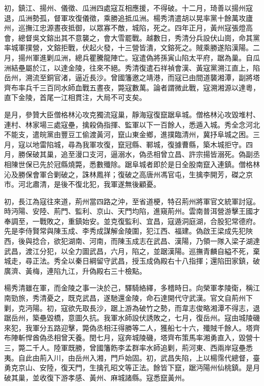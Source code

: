 \begin{pinyinscope}
初，鎮江、揚州、儀徵、瓜洲四處寇互相應援，不得破。十二月，琦善以揚州寇退，瓜洲勢孤，督軍攻復儀徵，乘勝追抵瓜洲。楊秀清遣胡以晃率黨十餘萬攻廬州，巡撫江忠源晝夜抵御，以眾寡不敵，城陷，死之。四年正月，黃州寇張燈高會，總督吳文鎔出其不意襲之，會大雪罷戰。越數日，秀清分兵設伏山崗，命其黨率城軍撲營，文鎔拒戰，伏起火發，十三營皆潰，文鎔死之。賊乘勝遂陷漢陽。二月，揚州軍進剿瓜洲，總兵瞿騰龍陣亡。寇遣偽將孫寅山陷太平府，踞為巢。自瓜洲結壘屬於江，以達金陵，往來不絕。秀清復遣石祥禎會漢、黃寇黨溯江直上，陷岳州，溯流至銅官渚，逼近長沙。曾國籓邀之靖港，而寇已由間道襲湘潭，副將塔齊布率兵千三百同水師血戰五晝夜，斃寇數萬。論者謂微此戰，寇溯湘源以達粵，直下金陵，首尾一江相貫注，大局不可支矣。

是月，參贊大臣僧格林沁攻克獨流寇巢，靜海寇復竄踞阜城。僧格林沁攻毀堆村、連村、林家場三處寇壘，擒殺偽指揮、監軍以下一百餘人，悉遁入城。秀全念河北不能支，遣皖黨由豐豆工偷渡黃河，竄山東金鄉，進撲臨清州，冀抒阜城之困。三月，寇以地雷陷城，尋為我軍攻復，竄冠縣、鄆城，復據曹縣，築木城拒守。四月，勝保破其巢，追至漫口支河，逼溺水，偽丞相曾立昌、許宗揚皆溺死。偽副丞相陳世保已先於冠縣燒斃，悉數殲除。踞阜城者即於是日全股南竄入連鎮。僧格林沁及勝保會軍合剿破之，誅林鳳祥；復破之高唐州馮官屯，生擒李開芳，磔之京市。河北肅清，是後不復北犯，我軍遂無後顧憂。

初，長江為寇往來道，荊州當四路之沖，至省道梗，特召荊州將軍官文統軍討寇。時沔陽、安陸、荊門、監利、京山、天門均陷，進窺荊州。雲南普洱營游擊王國才奉調至，一戰敗之，重鎮始安。並克復監利、宜昌，寇遁洞庭湖，合股犯常德府。先是李侍賢常與陳玉成、李秀成謀解金陵圍，犯江西、福建。偽啟王梁成先犯陜西，後與捻合，欲犯湖南、河南，而陳玉成志在武昌、漢陽，乃領一隊入梁子湖達武昌，渡江分犯，以全力圖武昌，六月，陷之，並踞漢陽。巡撫青麟自縊不死，棄城走，尋正法。秀全以秦日綱留守武昌，授玉成偽殿右十八指揮；還陷田家鎮，破廣濟、黃梅，連陷九江，升偽殿右三十檢點。

楊秀清雖在軍，而金陵之事一決於己，驛騎絡繹，多稽時日。向榮軍孝陵衛，稱江南勁旅，秀清憂之，既克武昌，遂馳還金陵，命石達開代守武漢。官文自荊州下剿，克沔陽。初，寇欲先取長沙，踞上游為破竹之勢，而韋志俊略湘潭不得志，退踞岳州，築壘毀橋，意圖久抗。我軍水師設伏誘敗之，七月，復岳州。寇由城陵磯來犯，我軍分五路迎擊，斃偽丞相汪得勝等二人，獲船七十六，殲賊千餘人。塔齊布陣斬悍酋偽丞相曾天養。閏七月，寇奔城陵磯，塔齊布策馬率湘勇直入，毀營十三，斃二千人。陸軍既勝，曾國籓飭李孟群率水師追剿，荊河東、西兩岸寇壘悉夷。自此由荊入川，由岳州入湘，門戶始固。初，武昌失陷，上以楊霈代總督，臺勇克京山、安陸，復天門，生擒孔昭文等正法。餘皆下竄，踞沔陽州仙桃鎮。是月破其巢，並收復下游孝感、黃州、麻城諸縣。寇悉竄黃州。


\end{pinyinscope}
